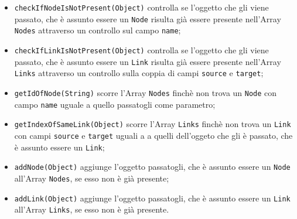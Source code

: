 	\begin{itemize}
		\item{\texttt{checkIfNodeIsNotPresent(Object)} controlla se l'oggetto che gli viene passato, che è assunto essere un \texttt{Node} risulta già essere presente nell'Array \texttt{Nodes} attraverso un controllo sul campo \texttt{name}; }
		\item{\texttt{checkIfLinkIsNotPresent(Object)} controlla se l'oggetto che gli viene passato, che è assunto essere un \texttt{Link} risulta già essere presente nell'Array \texttt{Links} attraverso un controllo sulla coppia di campi \texttt{source} e \texttt{target}; }
		\item{\texttt{getIdOfNode(String)} scorre l'Array \texttt{Nodes} finchè non trova un \texttt{Node} con campo \texttt{name} uguale a quello passatogli come parametro; }
		\item{\texttt{getIndexOfSameLink(Object)} scorre l'Array \texttt{Links} finchè non trova un \texttt{Link} con campi \texttt{source} e \texttt{target} uguali a a quelli dell'oggeto che gli è passato, che è assunto essere un \texttt{Link};}
		\item{\texttt{addNode(Object)} aggiunge l'oggetto passatogli, che è assunto essere un \texttt{Node} all'Array \texttt{Nodes}, se esso non è già presente;}
		\item{\texttt{addLink(Object)} aggiunge l'oggetto passatogli, che è assunto essere un \texttt{Link} all'Array \texttt{Links}, se esso non è già presente.}					
	\end{itemize}

